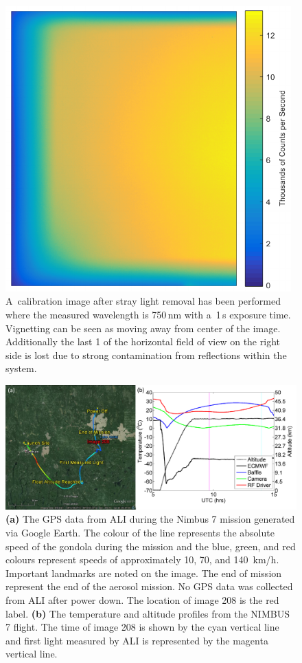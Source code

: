 \documentclass[amtd, online, hvmath]{copernicus}
\begin{document}
\begin{figure}
\includegraphics[height=110mm]{amt-2015-329-discussions-f07.pdf}
\caption{A~calibration image after stray light removal has been
  performed where the measured wavelength is 750\,\unit{nm} with
  a~1\,s exposure time.  Vignetting can be seen as moving away from
  center of the image. Additionally the last 1{\degree} of the
  horizontal field of view on the right side is lost due to strong
  contamination from reflections within the system.}
\label{amtd-2015-0329-f07.pdf}
\end{figure}

\begin{figure}
\includegraphics[width=120mm]{amt-2015-329-discussions-f08.pdf}
\caption{\textbf{(a)} The GPS data from ALI during the Nimbus 7
  mission generated via Google Earth. The colour of the line
  represents the absolute speed of the gondola during the
  mission and the blue, green, and red colours represent speeds of approximately
  10, 70, and 140~km/h. Important landmarks are noted on the image.  The end of
  mission represent the end of the aerosol mission. No GPS data was
  collected from ALI after power down. The location of image 208 is
  the red label. \textbf{(b)} The temperature and altitude profiles
  from the NIMBUS 7 flight.  The time of image 208 is shown by the
  cyan vertical line and first light measured by ALI is represented by the
  magenta vertical line.}
\label{amtd-2015-0329-f08.pdf}
\end{figure}
\end{document}
